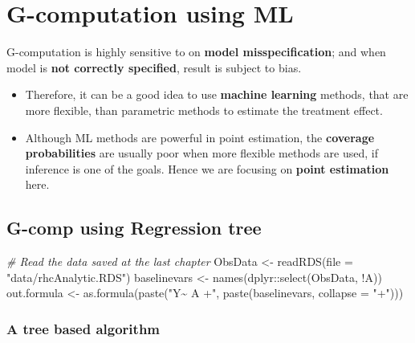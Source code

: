 \documentclass[
]{book}
\newenvironment{Shaded}{\begin{snugshade}}{\end{snugshade}}
\newcommand{\AttributeTok}[1]{\textcolor[rgb]{0.77,0.63,0.00}{#1}}
\newcommand{\CommentTok}[1]{\textcolor[rgb]{0.56,0.35,0.01}{\textit{#1}}}
\newcommand{\FunctionTok}[1]{\textcolor[rgb]{0.00,0.00,0.00}{#1}}
\newcommand{\NormalTok}[1]{#1}
\newcommand{\OtherTok}[1]{\textcolor[rgb]{0.56,0.35,0.01}{#1}}
\newcommand{\SpecialCharTok}[1]{\textcolor[rgb]{0.00,0.00,0.00}{#1}}
\newcommand{\StringTok}[1]{\textcolor[rgb]{0.31,0.60,0.02}{#1}}
\providecommand{\tightlist}{%
  \setlength{\itemsep}{0pt}\setlength{\parskip}{0pt}}
\begin{document}
\hypertarget{g-computation-using-ml}{%
\chapter{G-computation using ML}\label{g-computation-using-ml}}

\begin{rmdcomment}
G-computation is highly sensitive to on \textbf{model misspecification};
and when model is \textbf{not correctly specified}, result is subject to
bias.
\end{rmdcomment}

\begin{itemize}
\tightlist
\item
  Therefore, it can be a good idea to use \textbf{machine learning} methods, that are more flexible, than parametric methods to estimate the treatment effect.
\item
  Although ML methods are powerful in point estimation, the \textbf{coverage probabilities} are usually poor when more flexible methods are used, if inference is one of the goals. Hence we are focusing on \textbf{point estimation} here.
\end{itemize}

\hypertarget{g-comp-using-regression-tree}{%
\section{G-comp using Regression tree}\label{g-comp-using-regression-tree}}

\begin{Shaded}
\begin{Highlighting}[]
\CommentTok{\# Read the data saved at the last chapter}
\NormalTok{ObsData }\OtherTok{\textless{}{-}} \FunctionTok{readRDS}\NormalTok{(}\AttributeTok{file =} \StringTok{"data/rhcAnalytic.RDS"}\NormalTok{)}
\NormalTok{baselinevars }\OtherTok{\textless{}{-}} \FunctionTok{names}\NormalTok{(dplyr}\SpecialCharTok{::}\FunctionTok{select}\NormalTok{(ObsData, }\SpecialCharTok{!}\NormalTok{A))}
\NormalTok{out.formula }\OtherTok{\textless{}{-}} \FunctionTok{as.formula}\NormalTok{(}\FunctionTok{paste}\NormalTok{(}\StringTok{"Y\textasciitilde{} A +"}\NormalTok{,}
                               \FunctionTok{paste}\NormalTok{(baselinevars,}
                                     \AttributeTok{collapse =} \StringTok{"+"}\NormalTok{)))}
\end{Highlighting}
\end{Shaded}

\hypertarget{a-tree-based-algorithm}{%
\subsection{A tree based algorithm}\label{a-tree-based-algorithm}}
\end{document}
